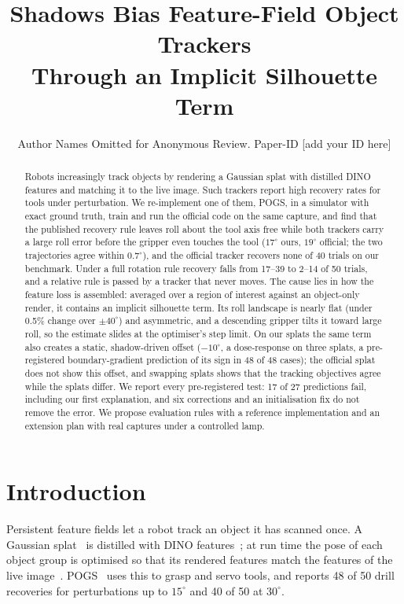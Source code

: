 \documentclass[conference]{IEEEtran}
\begin{document}
\title{Shadows Bias Feature-Field Object Trackers\\Through an Implicit Silhouette Term}
\author{Author Names Omitted for Anonymous Review. Paper-ID [add your ID here]}
\maketitle

\begin{abstract}
Robots increasingly track objects by rendering a Gaussian splat with distilled DINO features and matching it to
the live image. Such trackers report high recovery rates for tools under perturbation. We re-implement one of them,
POGS, in a simulator with exact ground truth, train and run the official code on the same capture, and find that
the published recovery rule leaves roll about the tool axis free while both trackers carry a large roll error before
the gripper even touches the tool ($17^\circ$ ours, $19^\circ$ official; the two trajectories agree within
$0.7^\circ$), and the official tracker recovers none of 40 trials on our benchmark. Under a full rotation rule recovery falls from 17--39 to 2--14 of 50 trials, and a relative rule is
passed by a tracker that never moves. The cause lies in how the feature loss is assembled: averaged over a region of
interest against an object-only render, it contains an implicit silhouette term. Its roll landscape is nearly flat
(under 0.5\% change over $\pm40^\circ$) and asymmetric, and a descending gripper tilts it toward large roll, so the
estimate slides at the optimiser's step limit. On our splats the same term also creates a static, shadow-driven
offset ($-10^\circ$, a dose-response on three splats, a pre-registered boundary-gradient prediction of its sign in
48 of 48 cases); the official splat does not show this offset, and swapping splats shows that the tracking objectives
agree while the splats differ. We report every pre-registered test: 17 of 27 predictions fail, including our first
explanation, and six corrections and an initialisation fix do not remove the error. We propose evaluation rules with a reference implementation and an extension
plan with real captures under a controlled lamp.
\end{abstract}

\IEEEpeerreviewmaketitle

\section{Introduction}
Persistent feature fields let a robot track an object it has scanned once. A Gaussian
splat~\cite{kerbl2023gaussian} is distilled with DINO features~\cite{oquab2024dinov2}; at run time the pose of each
object group is optimised so that its rendered features match the features of the live
image~\cite{kerr2024rsrd,yu2025pogs}. POGS~\cite{yu2025pogs} uses this to grasp and servo tools, and reports 48 of 50
drill recoveries for perturbations up to $15^\circ$ and 40 of 50 at $30^\circ$.
\end{document}

